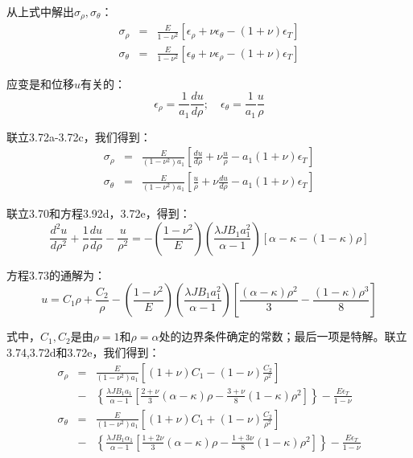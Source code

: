 从上式中解出$\sigma_\rho,\sigma_{\theta}$：
\begin{eqnarray}
\sigma_\rho&=&\frac{E}{1-\nu^2}[\epsilon_\rho+\nu\epsilon_\theta-(1+\nu)\epsilon_T]\\
\sigma_\theta&=&\frac{E}{1-\nu^2}[\epsilon_\theta+\nu\epsilon_\rho-(1+\nu)\epsilon_T]
\end{eqnarray}

应变是和位移$u$有关的：
\begin{equation}
\epsilon_\rho=\frac{1}{a_1}\frac{du}{d\rho};\quad \epsilon_\theta=\frac{1}{a_1}\frac{u}{\rho}
\end{equation}

联立3.72a-3.72c，我们得到：
\begin{eqnarray}
\sigma_\rho&=&\frac{E}{(1-\nu^2)a_1}[\frac{du}{d\rho}+\nu\frac{u}{\rho}-a_1(1+\nu)\epsilon_T]\\
\sigma_\theta&=&\frac{E}{(1-\nu^2)a_1}[\frac{u}{\rho}+\nu\frac{du}{d\rho}-a_1(1+\nu)\epsilon_T]
\end{eqnarray}

联立3.70和方程3.92d，3.72e，得到：
\begin{equation}
\frac{d^2u}{d\rho^2}+\frac{1}{\rho}\frac{du}{d\rho}-\frac{u}{\rho^2}=-(\frac{1-\nu^2}{E})(\frac{\lambda JB_1a_1^2}{\alpha-1})[\alpha-\kappa-(1-\kappa)\rho] %
\end{equation}

方程3.73的通解为：
\begin{equation}
u=C_1\rho+\frac{C_2}{\rho}-(\frac{1-\nu^2}{E})(\frac{\lambda JB_1a_1^2}{\alpha-1})[\frac{(\alpha-\kappa)\rho^2}{3}-\frac{(1-\kappa)\rho^3}{8}]%
\end{equation}

式中，$C_1,C_2$是由$\rho=1$和$\rho=\alpha$处的边界条件确定的常数；最后一项是特解。联立3.74,3.72d和3.72e，我们得到：
\begin{eqnarray}
\sigma_\rho&=&\frac{E}{(1-\nu^2)a_1}\left[(1+\nu)C_1-(1-\nu)\frac{C_2}{\rho^2}\right] \\ \nonumber
&-&\left\{\frac{\lambda JB_1a_1}{\alpha-1}[\frac{2+\nu}{3}(\alpha-\kappa)\rho-\frac{3+\nu}{8}(1-\kappa)\rho^2]\right\}-\frac{E\epsilon_T}{1-\nu}\\
\sigma_\theta&=&\frac{E}{(1-\nu^2)a_1}\left[(1+\nu)C_1+(1-\nu)\frac{C_2}{\rho^2}\right]\\ \nonumber
&-&\left\{\frac{\lambda JB_1\alpha_1}{\alpha-1}[\frac{1+2\nu}{3}(\alpha-\kappa)\rho-\frac{1+3\nu}{8}(1-\kappa)\rho^2]\right\}-\frac{E\epsilon_T}{1-\nu}
\end{eqnarray}

